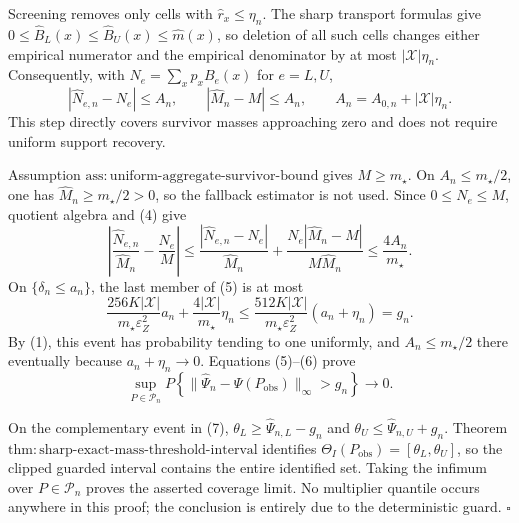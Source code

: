 Screening removes only cells with \(\widehat r_x\le\eta_n\).  The sharp
transport formulas give
\(0\le\widehat B_L(x)\le\widehat B_U(x)\le\widehat m(x)\), so deletion of
all such cells changes either empirical numerator and the empirical
denominator by at most \(|\mathcal X|\eta_n\).  Consequently, with
\(N_e=\sum_xp_xB_e(x)\) for \(e=L,U\),
\[
|\widehat N_{e,n}-N_e|\le A_n,
\qquad
|\widehat M_n-M|\le A_n,
\qquad
A_n=A_{0,n}+|\mathcal X|\eta_n.
\tag{4}
\]
This step directly covers survivor masses approaching zero and does not
require uniform support recovery.

Assumption \(\mathrm{ass{:}uniform\text{-}aggregate\text{-}survivor\text{-}bound}\)
gives \(M\ge m_{\star}\).  On \(A_n\le m_{\star}/2\), one has
\(\widehat M_n\ge m_{\star}/2>0\), so the fallback estimator is not used.
Since \(0\le N_e\le M\), quotient algebra and (4) give
\[
\left|\frac{\widehat N_{e,n}}{\widehat M_n}-\frac{N_e}{M}\right|
\le\frac{|\widehat N_{e,n}-N_e|}{\widehat M_n}
+\frac{N_e|\widehat M_n-M|}{M\widehat M_n}
\le\frac{4A_n}{m_{\star}}.
\tag{5}
\]
On \(\{\delta_n\le a_n\}\), the last member of (5) is at most
\[
\frac{256K|\mathcal X|}{m_{\star}\varepsilon_Z^2}a_n
+\frac{4|\mathcal X|}{m_{\star}}\eta_n
\le
\frac{512K|\mathcal X|}{m_{\star}\varepsilon_Z^2}
(a_n+\eta_n)=g_n.
\tag{6}
\]
By (1), this event has probability tending to one uniformly, and
\(A_n\le m_{\star}/2\) there eventually because
\(a_n+\eta_n\to0\).  Equations (5)--(6) prove
\[
\sup_{P\in\mathcal P_n}
P\!\left\{\|\widehat\Psi_n-\Psi(P_{\mathrm{obs}})\|_\infty>g_n\right\}
\longrightarrow0.
\tag{7}
\]

On the complementary event in (7),
\(\theta_L\ge\widehat\Psi_{n,L}-g_n\) and
\(\theta_U\le\widehat\Psi_{n,U}+g_n\).  Theorem
\(\mathrm{thm{:}sharp\text{-}exact\text{-}mass\text{-}threshold\text{-}interval}\)
identifies \(\Theta_I(P_{\mathrm{obs}})=[\theta_L,\theta_U]\), so the
clipped guarded interval contains the entire identified set.  Taking the
infimum over \(P\in\mathcal P_n\) proves the asserted coverage limit.
No multiplier quantile occurs anywhere in this proof; the conclusion is
entirely due to the deterministic guard. \(\square\)